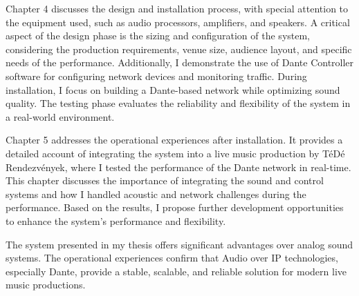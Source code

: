 Chapter 4 discusses the design and installation process, with special 
attention to the equipment used, such as audio processors, amplifiers, and speakers. 
A critical aspect of the design phase is the sizing and configuration 
of the system, considering the production requirements, venue size, 
audience layout, and specific needs of the performance. 
Additionally, I demonstrate the use of Dante Controller software for 
configuring network devices and monitoring traffic. During installation, 
I focus on building a Dante-based network while optimizing sound quality. 
The testing phase evaluates the reliability and flexibility of the system in a real-world environment.

Chapter 5 addresses the operational experiences after installation. 
It provides a detailed account of integrating the system into a 
live music production by TéDé Rendezvények, where I tested the performance 
of the Dante network in real-time. This chapter discusses the importance of 
integrating the sound and control systems and how I handled acoustic and 
network challenges during the performance. Based on the results, 
I propose further development opportunities to enhance the system’s performance and flexibility.

The system presented in my thesis offers significant advantages over analog sound systems. 
The operational experiences confirm that Audio over IP technologies, especially Dante, 
provide a stable, scalable, and reliable solution for modern live music productions.

\vfill
\selectthesislanguage

\setcounter{romanPage}{\value{page}}
